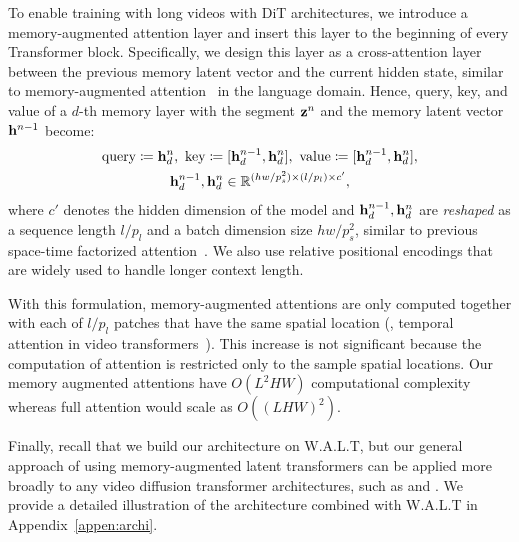 To enable training with long videos with DiT architectures, we introduce a memory-augmented attention layer and insert this layer to the beginning of every Transformer block. Specifically, we design this layer as a cross-attention layer between the previous memory latent vector and the current hidden state, similar to memory-augmented attention~\citep{dai2019transformer} in the language domain. Hence, query, key, and value of a $d$-th memory layer with the segment $\mathbf{z}^{n}$ and the memory latent vector $\mathbf{h}^{n-1}$ become:
\begin{gather*}
    \text{query}\coloneqq \mathbf{h}_{d}^{n},\,\,\text{key} \coloneqq [\mathbf{h}_{d}^{n-1}, \mathbf{h}_{d}^{n}],\,\,\text{value}\coloneqq [\mathbf{h}_{d}^{n-1}, \mathbf{h}_{d}^{n}], \\ \mathbf{h}_{d}^{n-1}, \mathbf{h}_{d}^{n} \in \mathbb{R}^{(hw / p_s^2) \times (l/p_l) \times c'},
\end{gather*}
where $c'$ denotes the hidden dimension of the model and $\mathbf{h}_{d}^{n-1}, \mathbf{h}_{d}^{n}$ are \emph{reshaped} as a sequence length $l/p_l$ and a batch dimension size $hw/p_s^2$, similar to previous space-time factorized attention~\citep{bertasius2021space}. 
We also use relative positional encodings that are widely used to handle longer context length.

With this formulation, memory-augmented attentions are only computed together with each of $l/p_l$ patches that have the same spatial location (\ie, temporal attention in video transformers~\citep{bertasius2021space}). This increase is not significant because the computation of attention is restricted only to the sample spatial locations. Our 
memory augmented attentions have $O(L^2HW)$ computational complexity whereas full attention would scale as $O((LHW)^2)$.

Finally, recall that we build our architecture on W.A.L.T, but our general approach of using memory-augmented latent transformers can be applied more broadly to any video diffusion transformer architectures, such as \citet{lu2023vdt} and \citet{ma2024latte}. We provide a detailed illustration of the architecture combined with W.A.L.T in Appendix~\ref{appen:archi}.